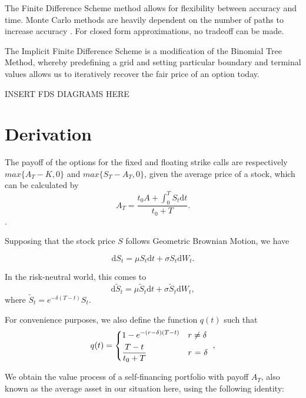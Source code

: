 \documentclass{article}
\begin{document}
The Finite Difference Scheme method allows for flexibility between accuracy and time. Monte Carlo methods are heavily dependent on the number of paths to increase accuracy \cite{montecarlo}. For closed form approximations, no tradeoff can be made.

The Implicit Finite Difference Scheme is a modification of the Binomial Tree Method, whereby predefining a grid and setting particular boundary and terminal values allows us to iteratively recover the fair price of an option today.

INSERT FDS DIAGRAMS HERE

\section{Derivation}

The payoff of the options for the fixed and floating strike calls are respectively \(max\{A_T - K, 0\}\) and \(max\{S_T - A_T, 0\}\), given the average price of a stock, which can be calculated by
\begin{equation}
  A_T = \frac{t_0A + \int_0^T S_t \mathrm{d}t}{t_0 + T}.
\end{equation}.

Supposing that the stock price \(S\) follows Geometric Brownian Motion, we have

\begin{equation}
  \mathrm{d}S_t = \mu S_t \mathrm{d}t + \sigma S_t \mathrm{d}W_t.
\end{equation}

In the risk-neutral world, this comes to
\begin{equation}
  \mathrm{d}\tilde{S}_t = \mu \tilde{S}_t \mathrm{d}t + \sigma \tilde{S}_t \mathrm{d}W_t,
\end{equation}
where \(\tilde{S}_t = e^{-\delta(T-t)}S_t\).

For convenience purposes, we also define the function \(q(t)\) such that
\begin{equation}
  q(t) =
  \begin{dcases*}
    1 - e^{-(r-\delta)(T-t)} & \(r \neq \delta\) \\
    \frac{T-t}{t_0 + T} & \(r\) = \(\delta\)
  \end{dcases*},
\end{equation}

We obtain the value process of a self-financing portfolio with payoff \(A_T\), also known as the average asset in our situation here, using the following identity:
\end{document}
